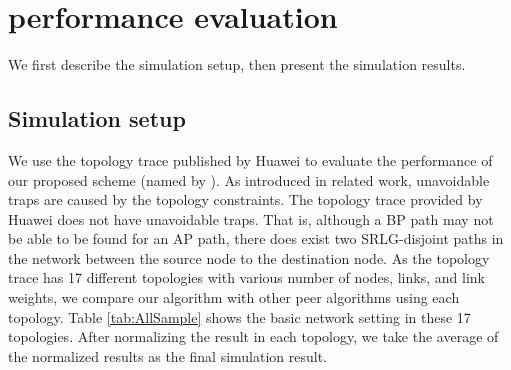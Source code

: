 \section{performance evaluation}
\label{sec:performance evaluation}
We first describe the simulation setup, then present the simulation results.
\subsection{Simulation setup}
We use the topology trace published by Huawei to evaluate the performance of our proposed scheme (named by \CI). As introduced in related work, unavoidable traps are caused by the topology constraints. The topology trace provided by Huawei does not have unavoidable traps. That is,  although a BP path may not be able to be found for an AP path, there does exist two SRLG-disjoint paths in the network between the source node to the destination node. As the topology trace has 17 different topologies with various number of nodes, links, and link weights, we compare our algorithm with other peer algorithms using each topology. Table \ref{tab:AllSample} shows the basic network setting in these 17 topologies. After normalizing the result in each topology, we take the average of the normalized results as the final simulation result.

